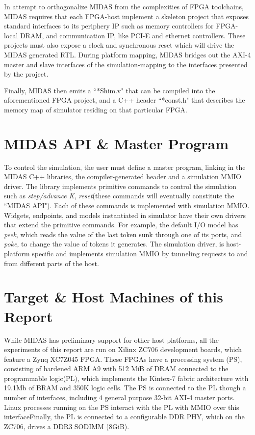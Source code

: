 In attempt to orthogonalize MIDAS from the complexities of FPGA toolchains,
MIDAS requires that each FPGA-host implement a skeleton project that exposes
standard interfaces to its periphery IP such as memory controllers for
FPGA-local DRAM, and communication IP, like PCI-E and ethernet controllers.
These projects must also expose a clock and synchronous reset which will drive
the MIDAS generated RTL.  During platform mapping, MIDAS bridges out the AXI-4
master and slave interfaces of the simulation-mapping to the interfaces
presented by the project.

Finally, MIDAS then emits a ``*Shim.v" that can be compiled into the
aforementioned FPGA project, and a C++ header ``*const.h" that describes the
memory map of simulator residing on that particular FPGA.

\section{MIDAS API \& Master Program}

To control the simulation, the user must define a master program, linking in
the MIDAS C++ libraries, the compiler-generated header and a simulation MMIO
driver.  The library implements primitive commands to control the simulation
such as \emph{step/advance K}, \emph{reset}(these commands will eventually
constitute the ``MIDAS API"). Each of these commands is implemented with
simulation MMIO.  Widgets, endpoints, and models instantiated in simulator have
their own drivers that extend the primitive commands.  For example, the default
I/O model has \emph{peek}, which reads the value of the last token sunk through
one of its ports, and \emph{poke}, to change the value of tokens it generates.  The
simulation driver, is host-platform specific and implements simulation MMIO by
tunneling requests to and from different parts of the host.

\section{Target \& Host Machines of this Report}\label{sec:targetandhostmachines}

While MIDAS has preliminary support for other host platforms, all the
experiments of this report are run on Xilinx ZC706 development boards, which
feature a Zynq XC7Z045 FPGA. These FPGAs have a processing system (PS),
consisting of hardened ARM A9 with 512 MiB of DRAM connected to the
programmable logic(PL), which implements the Kintex-7 fabric architecture with
19.1Mb of BRAM and 350K logic cells. The PS is connected to the PL though a
number of interfaces, including 4 general purpose 32-bit AXI-4 master ports.
Linux processes running on the PS interact with the PL with MMIO over this
interfaceFinally, the PL is connected to a configurable DDR PHY, which on the
ZC706, drives a DDR3 SODIMM (8GiB).

